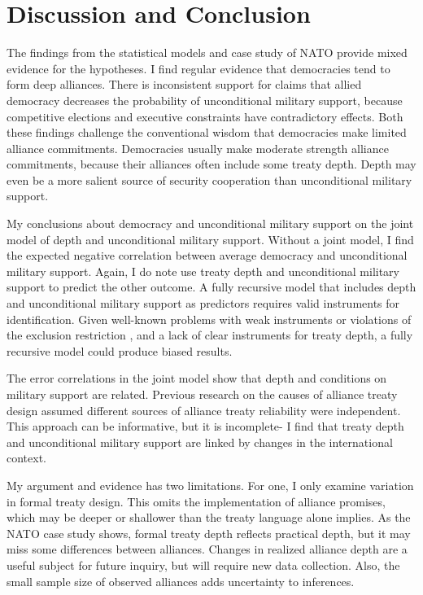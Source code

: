 \documentclass[12pt]{article}
\begin{document}
\section{Discussion and Conclusion}


The findings from the statistical models and case study of NATO provide mixed evidence for the hypotheses. 
I find regular evidence that democracies tend to form deep alliances.
There is inconsistent support for claims that allied democracy decreases the probability of unconditional military support, because competitive elections and executive constraints have contradictory effects. 
Both these findings challenge the conventional wisdom that democracies make limited alliance commitments.
Democracies usually make moderate strength alliance commitments, because their alliances often include some treaty depth. 
Depth may even be a more salient source of security cooperation than unconditional military support. 


My conclusions about democracy and unconditional military support on the joint model of depth and unconditional military support.
Without a joint model, I find the expected negative correlation between average democracy and unconditional military support.   
Again, I do note use treaty depth and unconditional military support to predict the other outcome. 
A fully recursive model that includes depth and unconditional military support as predictors requires valid instruments for identification.
Given well-known problems with weak instruments \citep{Kraay2012} or violations of the exclusion restriction \citep{Bartels1991}, and a lack of clear instruments for treaty depth, a fully recursive model could produce biased results.  


The error correlations in the joint model show that depth and conditions on military support are related.  
Previous research on the causes of alliance treaty design \citep{Benson2012, Mattes2012, Chibaetal2015} assumed different sources of alliance treaty reliability were independent. 
This approach can be informative, but it is incomplete- I find that treaty depth and unconditional military support are linked by changes in the international context. 


My argument and evidence has two limitations. 
For one, I only examine variation in formal treaty design. 
This omits the implementation of alliance promises, which may be deeper or shallower than the treaty language alone implies. 
As the NATO case study shows, formal treaty depth reflects practical depth, but it may miss some differences between alliances. 
Changes in realized alliance depth are a useful subject for future inquiry, but will require new data collection.
Also, the small sample size of observed alliances adds uncertainty to inferences.  
\end{document}
